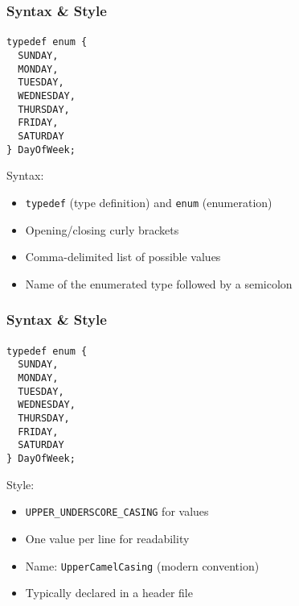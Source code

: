 \documentclass[]{beamer}
\begin{document}
\begin{frame}[fragile]
    \frametitle{Syntax \& Style}
    \framesubtitle{}

\begin{minipage}[t]{0.4\linewidth}
\begin{verbatim}
typedef enum {
  SUNDAY,
  MONDAY,
  TUESDAY,
  WEDNESDAY,
  THURSDAY,
  FRIDAY,
  SATURDAY
} DayOfWeek;
\end{verbatim}
\end{minipage}
\begin{minipage}[t]{0.55\linewidth}
Syntax: 
\begin{itemize}[<+->]
  \item \texttt{typedef} (type definition) and \texttt{enum} (enumeration)
  \item Opening/closing curly brackets
  \item Comma-delimited list of possible values
  \item Name of the enumerated type followed by a semicolon
\end{itemize}
\end{minipage}

\end{frame}

\begin{frame}[fragile]
    \frametitle{Syntax \& Style}
    \framesubtitle{}

\begin{minipage}[t]{0.4\linewidth}
\begin{verbatim}
typedef enum {
  SUNDAY,
  MONDAY,
  TUESDAY,
  WEDNESDAY,
  THURSDAY,
  FRIDAY,
  SATURDAY
} DayOfWeek;
\end{verbatim}
\end{minipage}
\begin{minipage}[t]{0.55\linewidth}
Style: 
\begin{itemize}[<+->]
  \item \texttt{UPPER_UNDERSCORE_CASING} for values
  \item One value per line for readability
  \item Name: \texttt{UpperCamelCasing} (modern convention)
  \item Typically declared in a header file
\end{itemize}
\end{minipage}

\end{frame}
\end{document}
